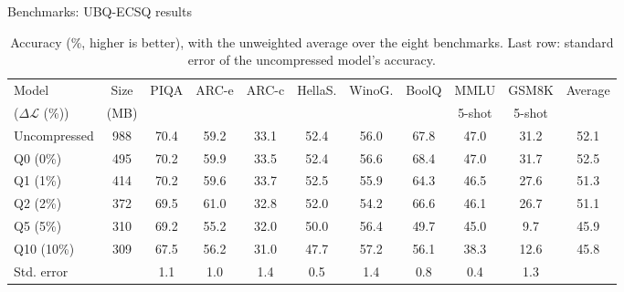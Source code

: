 \documentclass[aspectratio=169,10pt]{beamer}
\newcommand{\dloss}{\Delta\mathcal{L}}
\begin{document}
\begin{frame}{Benchmarks: UBQ-ECSQ results}{}
\begin{table}
\centering
\begin{adjustbox}{width=\linewidth, totalheight=0.64\textheight, keepaspectratio, center}
\centering
\small
\setlength{\tabcolsep}{4pt}
\begin{tabular}{lcccccccccc}
\toprule
Model & Size & PIQA & ARC-e & ARC-c & HellaS. & WinoG. & BoolQ & MMLU & GSM8K & Average \\
($\dloss$ (\%)) & (MB) &      &       &       &         &        &       & 5-shot & 5-shot &       \\
\midrule
Uncompressed & 988 & 70.4 & 59.2 & 33.1 & 52.4 & 56.0 & 67.8 & 47.0 & 31.2 & 52.1 \\
\addlinespace
Q0  (0\%)    & 495 & 70.2 & 59.9 & 33.5 & 52.4 & 56.6 & 68.4 & 47.0 & 31.7 & 52.5 \\
Q1  (1\%)    & 414 & 70.2 & 59.6 & 33.7 & 52.5 & 55.9 & 64.3 & 46.5 & 27.6 & 51.3 \\
Q2  (2\%)    & 372 & 69.5 & 61.0 & 32.8 & 52.0 & 54.2 & 66.6 & 46.1 & 26.7 & 51.1 \\
Q5  (5\%)    & 310 & 69.2 & 55.2 & 32.0 & 50.0 & 56.4 & 49.7 & 45.0 &  9.7 & 45.9 \\
Q10 (10\%)   & 309 & 67.5 & 56.2 & 31.0 & 47.7 & 57.2 & 56.1 & 38.3 & 12.6 & 45.8 \\
\midrule
Std. error   &     & 1.1  & 1.0  & 1.4  & 0.5  & 1.4  & 0.8  & 0.4  & 1.3  &      \\
\bottomrule
\end{tabular}
\end{adjustbox}
\caption{Accuracy (\%, higher is better), with the unweighted average over the eight benchmarks. Last
row: standard error of the uncompressed model's accuracy.}\label{tab:results}
\end{table}
\end{frame}
\end{document}
